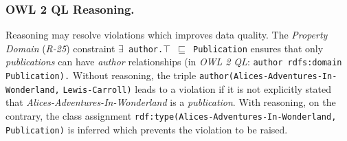 \documentclass{acm_proc_article-sp}
\newcommand{\ms}[1]{%
  \texttt{#1}
}
\newenvironment{DL}{
  \vspace{0cm}
  \begin{tabular}{l l}

}{
  \end{tabular}
}
\begin{document}
\subsubsection{OWL 2 QL Reasoning.}
Reasoning may resolve violations which improves data quality.
%
%
%
%
The {\em Property Domain} (\emph{R-25}) constraint
{\small\ms{$\exists$ author.$\top$ $\sqsubseteq$ Publication}} 
ensures that only \emph{publications} can have {\em author} relationships %
(in \emph{OWL 2 QL}: {\small\ms{author rdfs:domain Publication).}}
Without reasoning, the triple {\small\ms{author(Alices-Adventures-In-Wonderland,} \ms{Lewis-Carroll)}} leads to a violation
if it is not explicitly stated that \emph{Alices-Adventures-In-Wonderland} is a \emph{publication}. 
With reasoning, on the contrary, the class assignment {\small\ms{rdf:type(Alices-Adventures-In-Wonderland, Publication)}} is inferred which prevents the violation to be raised.

%
%
\end{document}
